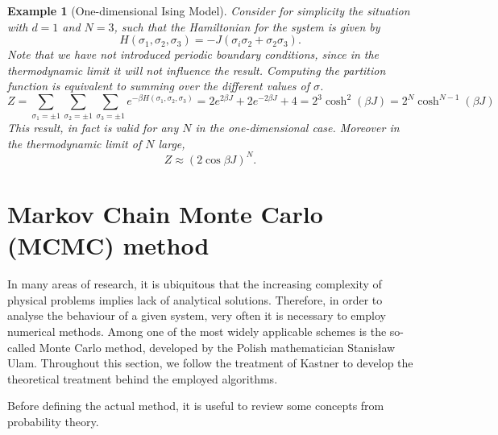 \documentclass[]{article}
\numberwithin{equation}{section}
\theoremstyle{break}
\newtheorem*{example}{Example}
\newcommand{\bk}{\par\null\par\noindent}
\begin{document}
\begin{example}[One-dimensional Ising Model]
Consider for simplicity the situation with $d=1$ and $N = 3$, such that the Hamiltonian for the system is given by \cite{cipra-1987}
\[H(\sigma_1, \sigma_2, \sigma_3) = -J(\sigma_i\sigma_2 + \sigma_2\sigma_3).\]
Note that we have not introduced periodic boundary conditions, since in the thermodynamic limit it will not influence the result. Computing the partition function is equivalent to summing over the different values of $\sigma$.
\[Z = \sum_{\sigma_1=\pm1}\sum_{\sigma_2 = \pm1}\sum_{\sigma_3=\pm1}e^{-\beta H(\sigma_1, \sigma_2, \sigma_3)} = 2e^{2\beta J} + 2e^{-2\beta J} + 4 = 2^3\cosh^2(\beta J) = 2^N\cosh^{N-1}(\beta J)\]
This result, in fact is valid for any $N$ in the one-dimensional case. Moreover in the thermodynamic limit of $N$ large,
\begin{equation}
Z \approx (2\cos\beta J)^N.
\label{eq:1d_Z}
\end{equation}
\end{example}
\newpage

\section{Markov Chain Monte Carlo (MCMC) method}
In many areas of research, it is ubiquitous that the increasing complexity of physical problems implies lack of analytical solutions. Therefore, in order to analyse the behaviour of a given system, very often it is necessary to employ numerical methods. Among one of the most widely applicable schemes is the so-called Monte Carlo method, developed by the Polish mathematician Stanisław Ulam. Throughout this section, we follow the treatment of Kastner \cite{kastner-2010} to develop the theoretical treatment behind the employed algorithms.
\bk
Before defining the actual method, it is useful to review some concepts from probability theory.
\end{document}
